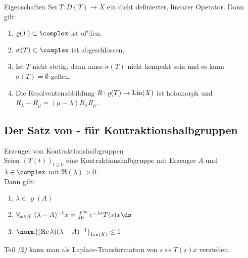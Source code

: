 \begin{Satz}{Eigenschaften}
    Sei $T\colon D(T) \rightarrow X$ ein dicht definierter, linearer Operator.
    Dann gilt:
    \begin{enumerate}
        \item
        $\varrho(T) \subset \complex$ ist of"|fen.
        
        \item
        $\sigma(T) \subset \complex$ ist abgeschlossen.
        
        \item
        Ist $T$ nicht stetig, dann muss $\sigma(T)$ nicht kompakt sein und es kann
        $\sigma(T) = \emptyset$ gelten.
        
        \item
        Die Resolventenabbildung $R\colon \varrho(T) \rightarrow \operatorname{Lin}(X)$
        ist holomorph und $R_\lambda - R_\mu = (\mu - \lambda) R_\lambda R_\mu$.
    \end{enumerate}
\end{Satz}

\subsection{%
    Der Satz von - für Kontraktionshalbgruppen%
}

\begin{Satz}{Erzeuger von Kontraktionshalbgruppen}\\
    Seien $(T(t))_{t \ge 0}$ eine Kontraktionshalbgruppe mit Erzeuger $A$ und
    $\lambda \in \complex$ mit $\Re(\lambda) > 0$.\\
    Dann gilt:
    \begin{enumerate}
        \item
        $\lambda \in \varrho(A)$
        
        \item
        $\forall_{x \in X}\; (\lambda-A)^{-1} x = \int_0^\infty e^{-\lambda s} T(s) x \ds$
        
        \item
        $\norm{(\Re \lambda) (\lambda-A)^{-1}}_{\Lin(X)} \le 1$
    \end{enumerate}
\end{Satz}

\begin{Bem}
    Teil \emph{(2)} kann man als Laplace-Transformation von $s \mapsto T(s) x$ verstehen.
\end{Bem}

